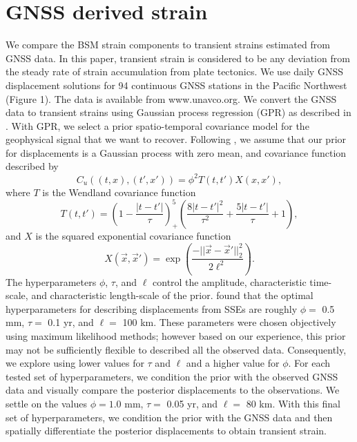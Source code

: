 \documentclass[10pt,a4paper]{article}
\begin{document}
\section{GNSS derived strain}
We compare the BSM strain components to transient strains estimated from GNSS data. In this paper, transient strain is considered to be any deviation from the steady rate of strain accumulation from plate tectonics.  We use daily GNSS displacement solutions for 94 continuous GNSS stations in the Pacific Northwest (Figure 1). The data is available from www.unavco.org. We convert the GNSS data to transient strains using Gaussian process regression (GPR) as described in \citet{Hines2017a}. With GPR, we select a prior spatio-temporal covariance model for the geophysical signal that we want to recover. Following \citet{Hines2017a}, we assume that our prior for displacements is a Gaussian process with zero mean, and covariance function described by 
\begin{equation}\label{cov}
C_u((t,x),(t',x')) = \phi^2 T(t,t')X(x,x'),
\end{equation}        
where $T$ is the Wendland covariance function
\begin{equation}\label{eq:Wendland}
T(t,t') = \left(1 - \frac{|t - t'|}{\tau}\right)^5_+ \left(\frac{8|t - t'|^2}{\tau^2} + \frac{5|t - t'|}{\tau} + 1\right), 
\end{equation}
and $X$ is the squared exponential covariance function
\begin{equation}\label{eq:SE}
X(\vec{x},\vec{x}') = \exp\left(\frac{-||\vec{x} - \vec{x}'||_2^2}{2 \ell^2}\right).
\end{equation}
The hyperparameters $\phi$, $\tau$, and $\ell$ control the amplitude, characteristic time-scale, and characteristic length-scale of the prior. \citet{Hines2017a} found that the optimal hyperparameters for describing displacements from SSEs are roughly $\phi =$ 0.5 mm, $\tau =$ 0.1 yr, and $\ell =$ 100 km. These parameters were chosen objectively using maximum likelihood methods; however based on our experience, this prior may not be sufficiently flexible to described all the observed data. Consequently, we explore using lower values for $\tau$ and $\ell$ and a higher value for $\phi$. For each tested set of hyperparameters, we condition the prior with the observed GNSS data and visually compare the posterior displacements to the observations. We settle on the values $\phi = 1.0$ mm, $\tau =$ 0.05 yr, and $\ell =$ 80 km. With this final set of hyperparameters, we condition the prior with the GNSS data and then spatially differentiate the posterior displacements to obtain transient strain.
\end{document}
